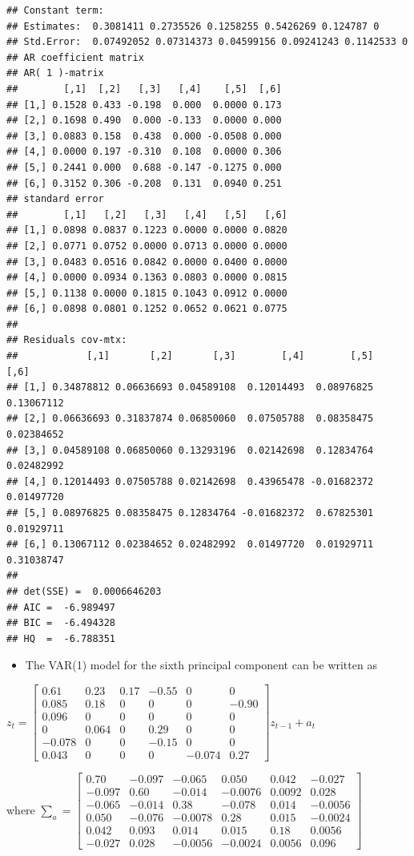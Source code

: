 \documentclass[]{article}
\providecommand{\tightlist}{%
  \setlength{\itemsep}{0pt}\setlength{\parskip}{0pt}}
\begin{document}
\begin{verbatim}
## Constant term: 
## Estimates:  0.3081411 0.2735526 0.1258255 0.5426269 0.124787 0 
## Std.Error:  0.07492052 0.07314373 0.04599156 0.09241243 0.1142533 0 
## AR coefficient matrix 
## AR( 1 )-matrix 
##        [,1]  [,2]   [,3]   [,4]    [,5]  [,6]
## [1,] 0.1528 0.433 -0.198  0.000  0.0000 0.173
## [2,] 0.1698 0.490  0.000 -0.133  0.0000 0.000
## [3,] 0.0883 0.158  0.438  0.000 -0.0508 0.000
## [4,] 0.0000 0.197 -0.310  0.108  0.0000 0.306
## [5,] 0.2441 0.000  0.688 -0.147 -0.1275 0.000
## [6,] 0.3152 0.306 -0.208  0.131  0.0940 0.251
## standard error 
##        [,1]   [,2]   [,3]   [,4]   [,5]   [,6]
## [1,] 0.0898 0.0837 0.1223 0.0000 0.0000 0.0820
## [2,] 0.0771 0.0752 0.0000 0.0713 0.0000 0.0000
## [3,] 0.0483 0.0516 0.0842 0.0000 0.0400 0.0000
## [4,] 0.0000 0.0934 0.1363 0.0803 0.0000 0.0815
## [5,] 0.1138 0.0000 0.1815 0.1043 0.0912 0.0000
## [6,] 0.0898 0.0801 0.1252 0.0652 0.0621 0.0775
##   
## Residuals cov-mtx: 
##            [,1]       [,2]       [,3]        [,4]        [,5]       [,6]
## [1,] 0.34878812 0.06636693 0.04589108  0.12014493  0.08976825 0.13067112
## [2,] 0.06636693 0.31837874 0.06850060  0.07505788  0.08358475 0.02384652
## [3,] 0.04589108 0.06850060 0.13293196  0.02142698  0.12834764 0.02482992
## [4,] 0.12014493 0.07505788 0.02142698  0.43965478 -0.01682372 0.01497720
## [5,] 0.08976825 0.08358475 0.12834764 -0.01682372  0.67825301 0.01929711
## [6,] 0.13067112 0.02384652 0.02482992  0.01497720  0.01929711 0.31038747
##   
## det(SSE) =  0.0006646203 
## AIC =  -6.989497 
## BIC =  -6.494328 
## HQ  =  -6.788351
\end{verbatim}

\begin{itemize}
\tightlist
\item
  The VAR(1) model for the sixth principal component can be written as
\end{itemize}

\(z_{t} =\left[\begin{array}{rrrrrr}0.61 & 0.23 & 0.17 & -0.55 & 0 & 0 \\0.085 & 0.18 & 0 & 0 & 0 & -0.90 \\0.096 & 0 & 0 & 0 & 0 & 0 \\ 0 & 0.064 & 0 & 0.29 & 0 & 0\\ -0.078 & 0 & 0 & -0.15 & 0 & 0 \\ 0.043 & 0 & 0 & 0 & -0.074 & 0.27\end{array}\right]z_{t-1} + a_{t}\)

where
\(\sum_{a} = \left[\begin{array}{rrrrrr}0.70 & -0.097 & -0.065 & 0.050 & 0.042 & -0.027\\-0.097 & 0.60 & -0.014 & -0.0076 & 0.0092 & 0.028 \\ -0.065 & -0.014 & 0.38 & -0.078 & 0.014 & -0.0056 \\ 0.050 & -0.076 & -0.0078 & 0.28 & 0.015 & -0.0024 \\ 0.042 & 0.093 & 0.014 & 0.015 & 0.18 & 0.0056 \\ -0.027 & 0.028 & -0.0056 & -0.0024 & 0.0056 & 0.096 \end{array}\right]\)
\end{document}
